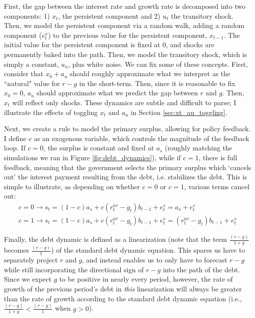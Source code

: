 \documentclass{article}
\begin{document}
First, the gap between the interest rate and growth rate is decomposed into two components: 1) $x_t$, the persistent component and 2) $u_t$ the transitory shock. Then, we model the persistent component via a random walk, adding a random component ($e_t^x$) to the previous value for the persistent component, $x_{t-1}$. The initial value for the persistent component is fixed at 0, and shocks are permanently baked into the path. Then, we model the transitory shock, which is simply a constant, $a_u$, plus white noise. We can fix some of these concepts. First, consider that $x_0 + a_u$ should roughly approximate what we interpret as the ``natural" value for $r-g$ in the short-term. Then, since it is reasonable to fix $x_0 = 0$, $a_u$ should approximate what we predict the gap between $r$ and $g$. Then, $x_t$ will reflect only shocks. These dynamics are subtle and difficult to parse; I illustrate the effects of toggling $x_t$ and $a_u$ in Section \ref{sec:xt_au_toggling}.

Next, we create a rule to model the primary surplus, allowing for policy feedback. I define $c$ as an exogenous variable, which controls the magnitude of the feedback loop. If $c=0$, the surplus is constant and fixed at $a_s$ (roughly matching the simulations we ran in Figure \ref{fig:debt_dynamics}), while if $c = 1$, there is full feedback, meaning that the government selects the primary surplus which `cancels out' the interest payment resulting from the debt, i.e. stabilizes the debt. This is simple to illustrate, as depending on whether $c = 0$ or $c = 1$, various terms cancel out:
\begin{gather}
	c = 0 \rightarrow s_t = (1-c)a_s + c(r^{av}_t - g_t)b_{t-1} + e_t^s = a_s + e_t^s \\
	c = 1 \rightarrow s_t = (1-c)a_s + c(r^{av}_t - g_t)b_{t-1} + e_t^s = (r^{av}_t - g_t)b_{t-1} + e_t^s
\end{gather}

Finally, the debt dynamic is defined as a linearization (note that the term $\frac{(r-g)}{1+g}$ becomes $\frac{(r-g)}{1}$) of the standard debt dynamic equation. This spares us have to separately project $r$ and $g$, and instead enables us to only have to forecast $r-g$ while still incorporating the directional sign of $r-g$ into the path of the debt. Since we expect $g$ to be positive in nearly every period, however, the rate of growth of the previous period's debt in \textit{this} linearization will always be greater than the rate of growth according to the standard debt dynamic equation (i.e., $\frac{(r-g)}{1+g} < \frac{(r-g)}{1}$ when $g > 0$). 
\end{document}
